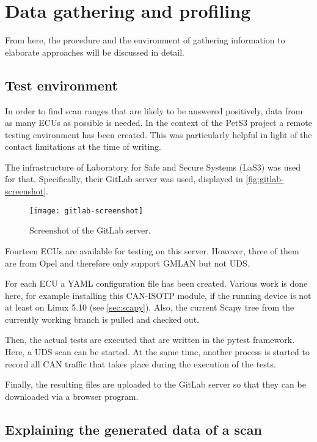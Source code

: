 \section{Data gathering and profiling}
\label{sec:data-gathering}

From here, the procedure and the environment of gathering information to elaborate approaches will be discussed in detail.

\subsection{Test environment}

In order to find scan ranges that are likely to be answered positively, data from as many ECUs as possible is needed. In the context of the PetS3 project a remote testing environment has been created. This was particularly helpful in light of the contact limitations at the time of writing.

The infrastructure of Laboratory for Safe and Secure Systems (LaS3) was used for that. Specifically, their GitLab server was used, displayed in \autoref{fig:gitlab-screenshot}.

\begin{figure}[h]
    \centering
    \texttt{[image: gitlab-screenshot]}
    \caption{Screenshot of the GitLab server.}
    \label{fig:gitlab-screenshot}
\end{figure}

Fourteen ECUs are available for testing on this server. However, three of them are from Opel and therefore only support GMLAN but not UDS.

For each ECU a YAML configuration file has been created. Various work is done here, for example installing this CAN-ISOTP module, if the running device is not at least on Linux 5.10 (see \autoref{sec:scapy}). Also, the current Scapy tree from the currently working branch is pulled and checked out.

Then, the actual tests are executed that are written in the pytest framework. Here, a UDS scan can be started. At the same time, another process is started to record all CAN traffic that takes place during the execution of the tests.

Finally, the resulting files are uploaded to the GitLab server so that they can be downloaded via a browser program.

\subsection{Explaining the generated data of a scan}

